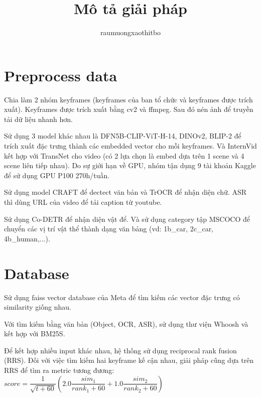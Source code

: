 \documentclass{article}
\title{Mô tả giải pháp}
\author{raumuongxaothitbo}
\date{}
\newcommand{\github}[1]{%
   \href{#1}{\faGithubSquare}%
}
\begin{document}
\maketitle


 
\section{Preprocess data}

Chia làm 2 nhóm keyframes (keyframes của ban tổ chức và keyframes được trích xuất). Keyframes được trích xuất bằng cv2 và ffmpeg. Sau đó nén ảnh để truyền tải dữ liệu nhanh hơn.

Sử dụng 3 model khác nhau là DFN5B-CLIP-ViT-H-14, DINOv2, BLIP-2 để trích xuất đặc trưng thành các embedded vector cho mỗi keyframes. Và InternVid kết hợp với TransNet cho video (có 2 lựa chọn là embed dựa trên 1 scene và 4 scene liên tiếp nhau). Do sự giới hạn về GPU, nhóm tận dụng 9 tài khoản Kaggle để sử dụng GPU P100 270h/tuần.

Sử dụng model CRAFT để dectect văn bản và TrOCR để nhận diện chữ. ASR thì dùng URL của video để tải caption từ youtube.

Sử dụng Co-DETR để nhận diện vật để. Và sử dụng category tập MSCOCO để chuyển các vị trí vật thể thành dạng văn bảng (vd: 1b\_car, 2c\_car, 4b\_human,...).

\section{Database \github{https://github.com/trungdangtapcode/Video-Retrieval-Search}}

Sử dụng faiss vector database của Meta để tìm kiếm các vector đặc trưng có similarity giống nhau.

Với tìm kiếm bằng văn bản (Object, OCR, ASR), sử dụng thư viện Whoosh và kết hợp với BM25S.

Để kết hợp nhiều input khác nhau, hệ thống sử dụng reciprocal rank fusion (RRS). Đối với việc tìm kiếm hai keyframe kế cận nhau, giải pháp cũng dựa trên RRS để tìm ra metric tương đương: $score = \dfrac{1}{\sqrt{t+60}}\left(2.0\dfrac{sim_1}{rank_1+60}+1.0\dfrac{sim_2}{rank_2+60}\right)$
\end{document}
